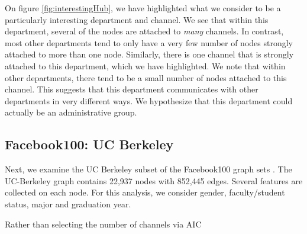 \documentclass[11pt]{amsart}
\begin{document}
On figure \ref{fig:interestingHub}, we have highlighted what we consider 
to be a particularly interesting department and channel. 
We see that within this department, several of the nodes are 
attached to \emph{many} channels. In contrast, most other departments 
tend to only have a very few number of nodes strongly attached 
to more than one node. Similarly, there is one channel that is strongly 
attached to this department, which we have highlighted. 
We note that within other departments, 
there tend to be a small number of nodes attached to this channel. 
This suggests that this department communicates with other 
departments in very different ways. 
We hypothesize that this department could actually be an administrative group.

\subsection{Facebook100: UC Berkeley}

Next, we examine the UC Berkeley subset of the Facebook100 graph sets \cite{fb100}. 
The UC-Berkeley graph contains 22,937 nodes with 852,445 edges. 
Several features are collected on each node. 
For this analysis, we consider gender, faculty/student status, 
major and graduation year. 

Rather than selecting the number of channels via AIC



\end{document}
